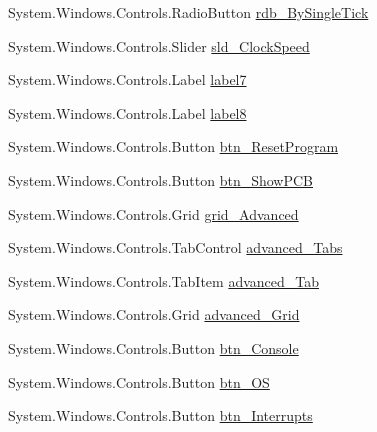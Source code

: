 \begin{DoxyCompactItemize}
\item 
System.\+Windows.\+Controls.\+Radio\+Button \hyperlink{class_c_p_u___o_s___simulator_1_1_main_window_ab40dcb618f5398ab67213476fe1b86ca}{rdb\+\_\+\+By\+Single\+Tick}
\item 
System.\+Windows.\+Controls.\+Slider \hyperlink{class_c_p_u___o_s___simulator_1_1_main_window_a39cd3af9bb0f8a3ccd06fdd44c9ed6a3}{sld\+\_\+\+Clock\+Speed}
\item 
System.\+Windows.\+Controls.\+Label \hyperlink{class_c_p_u___o_s___simulator_1_1_main_window_a38ed6363fd03954967bda7a099f6b07e}{label7}
\item 
System.\+Windows.\+Controls.\+Label \hyperlink{class_c_p_u___o_s___simulator_1_1_main_window_a216fc6a1692d8a8f8b80b08348c1dcd4}{label8}
\item 
System.\+Windows.\+Controls.\+Button \hyperlink{class_c_p_u___o_s___simulator_1_1_main_window_ada16565fc869dea1d54013009f5892b4}{btn\+\_\+\+Reset\+Program}
\item 
System.\+Windows.\+Controls.\+Button \hyperlink{class_c_p_u___o_s___simulator_1_1_main_window_a967a1b3dbde7ecb1d8091e5eababcc58}{btn\+\_\+\+Show\+P\+C\+B}
\item 
System.\+Windows.\+Controls.\+Grid \hyperlink{class_c_p_u___o_s___simulator_1_1_main_window_a65cbc082cd4737ec0dd8837efa715510}{grid\+\_\+\+Advanced}
\item 
System.\+Windows.\+Controls.\+Tab\+Control \hyperlink{class_c_p_u___o_s___simulator_1_1_main_window_a409f822cf5503ff0a45e14fb0f86a2aa}{advanced\+\_\+\+Tabs}
\item 
System.\+Windows.\+Controls.\+Tab\+Item \hyperlink{class_c_p_u___o_s___simulator_1_1_main_window_aa0cf25219ff7ec68cccc82f780e5f817}{advanced\+\_\+\+Tab}
\item 
System.\+Windows.\+Controls.\+Grid \hyperlink{class_c_p_u___o_s___simulator_1_1_main_window_a50b3891532cc5bfd0cc44e657bf95374}{advanced\+\_\+\+Grid}
\item 
System.\+Windows.\+Controls.\+Button \hyperlink{class_c_p_u___o_s___simulator_1_1_main_window_a9c127982ee67a80b67a9184b3a6e83d3}{btn\+\_\+\+Console}
\item 
System.\+Windows.\+Controls.\+Button \hyperlink{class_c_p_u___o_s___simulator_1_1_main_window_a85c48da4a6e5ccef782c998f73fd1aa6}{btn\+\_\+\+O\+S}
\item 
System.\+Windows.\+Controls.\+Button \hyperlink{class_c_p_u___o_s___simulator_1_1_main_window_a07a31310da6dfb301ef621d0cc34d802}{btn\+\_\+\+Interrupts}
\end{DoxyCompactItemize}

